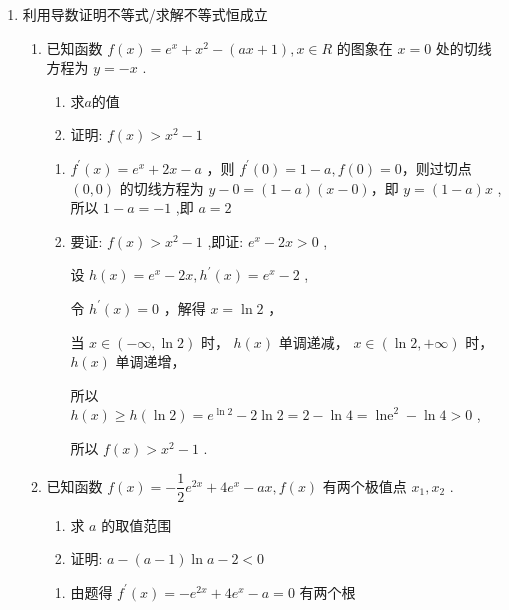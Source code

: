 \begin{enumerate}
    \item 利用导数证明不等式/求解不等式恒成立
    \begin{enumerate}
        \item 已知函数 $f\left( x\right)  = {{e}}^{x} + {x}^{2} - \left( {{ax} + 1}\right) ,x \in  {R}$ 的图象在 $x = 0$ 处的切线方程为 $y =  - x$ .
        \begin{enumerate}
            \item 求$a$的值
            \item 证明: $f\left( x\right)  > {x}^{2} - 1$
        \end{enumerate}
        \begin{jieda}
            \begin{enumerate}
                \item ${f}^{\prime }\left( x\right)  = {{e}}^{x} + {2x} - a$ ，则 ${f}^{\prime }\left( 0\right)  = 1 - a,f\left( 0\right)  = 0$，则过切点 $\left( {0,0}\right)$ 的切线方程为 $y - 0 = \left( {1 - a}\right) \left( {x - 0}\right)$，即 $y = \left( {1 - a}\right) x$ ,所以 $1 - a =  - 1$ ,即 $a = 2$ 
                
                \item 要证: $f\left( x\right)  > {x}^{2} - 1$ ,即证: ${{e}}^{x} - {2x} > 0$ ,
                
                设 $h\left( x\right)  = {{e}}^{x} - {2x},{h}^{\prime }\left( x\right)  = {{e}}^{x} - 2$ ,
                
                令 ${h}^{\prime }\left( x\right)  = 0$ ，解得 $x = \ln 2$ ，
                
                当 $x \in  \left( {-\infty ,\ln 2}\right)$ 时， $h\left( x\right)$ 单调递减， $x \in  \left( {\ln 2, + \infty }\right)$ 时， $h\left( x\right)$ 单调递增，
                
                所以 $h\left( x\right)  \geq  h\left( {\ln 2}\right)  = {{e}}^{\ln 2} - 2\ln 2 = 2 - \ln 4 = {\operatorname{lne}}^{2} - \ln 4 > 0$ ,
                
                所以 $f\left( x\right)  > {x}^{2} - 1$ .
            \end{enumerate}
        \end{jieda}
        
        \item 已知函数 $f\left( x\right)  =  - \dfrac{1}{2}{{e}}^{2x} + 4{{e}}^{x} - {ax},f\left( x\right)$ 有两个极值点 ${x}_{1},{x}_{2}$ .
        \begin{enumerate}
            \item 求 $a$ 的取值范围
            \item 证明: $a - \left( {a - 1}\right) \ln a - 2 < 0$
        \end{enumerate}
        \begin{jieda}
            \begin{enumerate}
                \item 由题得 ${f}^{\prime }\left( x\right)  =  - {{e}}^{2x} + 4{{e}}^{x} - a = 0$ 有两个根
                

\end{enumerate}
\end{jieda}
\end{enumerate}
\end{enumerate}
